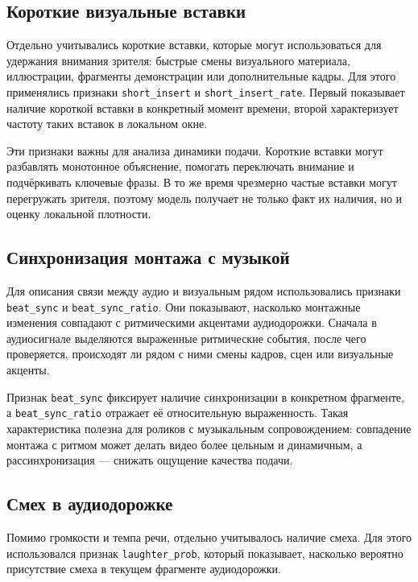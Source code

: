 \documentclass[times]{itmo-student-thesis}
\begin{document}
\subsection{Короткие визуальные вставки}

Отдельно учитывались короткие вставки, которые могут использоваться для удержания внимания зрителя: быстрые смены визуального материала, иллюстрации, фрагменты демонстрации или дополнительные кадры. Для этого применялись признаки \texttt{short\_insert} и \texttt{short\_insert\_rate}. Первый показывает наличие короткой вставки в конкретный момент времени, второй характеризует частоту таких вставок в локальном окне.

Эти признаки важны для анализа динамики подачи. Короткие вставки могут разбавлять монотонное объяснение, помогать переключать внимание и подчёркивать ключевые фразы. В то же время чрезмерно частые вставки могут перегружать зрителя, поэтому модель получает не только факт их наличия, но и оценку локальной плотности.

\subsection{Синхронизация монтажа с музыкой}

Для описания связи между аудио и визуальным рядом использовались признаки \texttt{beat\_sync} и \texttt{beat\_sync\_ratio}. Они показывают, насколько монтажные изменения совпадают с ритмическими акцентами аудиодорожки. Сначала в аудиосигнале выделяются выраженные ритмические события, после чего проверяется, происходят ли рядом с ними смены кадров, сцен или визуальные акценты.

Признак \texttt{beat\_sync} фиксирует наличие синхронизации в конкретном фрагменте, а \texttt{beat\_sync\_ratio} отражает её относительную выраженность. Такая характеристика полезна для роликов с музыкальным сопровождением: совпадение монтажа с ритмом может делать видео более цельным и динамичным, а рассинхронизация — снижать ощущение качества подачи.

\subsection{Смех в аудиодорожке}

Помимо громкости и темпа речи, отдельно учитывалось наличие смеха. Для этого использовался признак \texttt{laughter\_prob}, который показывает, насколько вероятно присутствие смеха в текущем фрагменте аудиодорожки.
\end{document}
